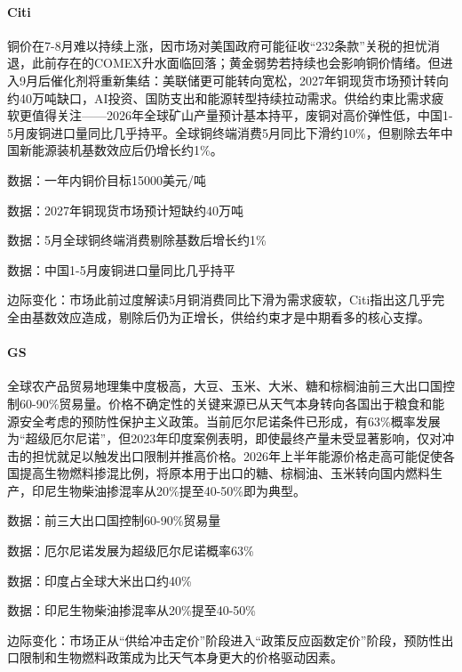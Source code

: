 \documentclass[11pt]{ctexart}
\begin{document}
\paragraph{Citi} 铜价在7-8月难以持续上涨，因市场对美国政府可能征收“232条款”关税的担忧消退，此前存在的COMEX升水面临回落；黄金弱势若持续也会影响铜价情绪。但进入9月后催化剂将重新集结：美联储更可能转向宽松，2027年铜现货市场预计转向约40万吨缺口，AI投资、国防支出和能源转型持续拉动需求。供给约束比需求疲软更值得关注——2026年全球矿山产量预计基本持平，废铜对高价弹性低，中国1-5月废铜进口量同比几乎持平。全球铜终端消费5月同比下滑约10\%，但剔除去年中国新能源装机基数效应后仍增长约1\%。
{\small\color{refgray}数据：一年内铜价目标15000美元/吨\par}
{\small\color{refgray}数据：2027年铜现货市场预计短缺约40万吨\par}
{\small\color{refgray}数据：5月全球铜终端消费剔除基数后增长约1\%\par}
{\small\color{refgray}数据：中国1-5月废铜进口量同比几乎持平\par}
{\small\color{refgray}边际变化：市场此前过度解读5月铜消费同比下滑为需求疲软，Citi指出这几乎完全由基数效应造成，剔除后仍为正增长，供给约束才是中期看多的核心支撑。\par}
\paragraph{GS} 全球农产品贸易地理集中度极高，大豆、玉米、大米、糖和棕榈油前三大出口国控制60-90\%贸易量。价格不确定性的关键来源已从天气本身转向各国出于粮食和能源安全考虑的预防性保护主义政策。当前厄尔尼诺条件已形成，有63\%概率发展为“超级厄尔尼诺”，但2023年印度案例表明，即使最终产量未受显著影响，仅对冲击的担忧就足以触发出口限制并推高价格。2026年上半年能源价格走高可能促使各国提高生物燃料掺混比例，将原本用于出口的糖、棕榈油、玉米转向国内燃料生产，印尼生物柴油掺混率从20\%提至40-50\%即为典型。
{\small\color{refgray}数据：前三大出口国控制60-90\%贸易量\par}
{\small\color{refgray}数据：厄尔尼诺发展为超级厄尔尼诺概率63\%\par}
{\small\color{refgray}数据：印度占全球大米出口约40\%\par}
{\small\color{refgray}数据：印尼生物柴油掺混率从20\%提至40-50\%\par}
{\small\color{refgray}边际变化：市场正从“供给冲击定价”阶段进入“政策反应函数定价”阶段，预防性出口限制和生物燃料政策成为比天气本身更大的价格驱动因素。\par}
\end{document}
